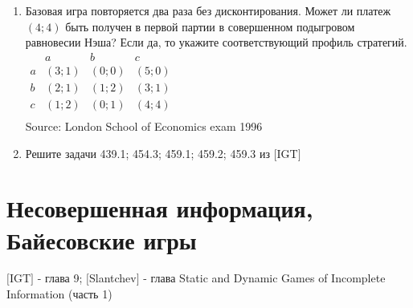 \documentclass[pdftex,12pt,a4paper]{article}
\begin{document}
\begin{enumerate}
\item 
Базовая игра повторяется два раза без дисконтирования. Может ли платеж $\left( {4;4} \right)$
 быть получен в первой партии в совершенном подыгровом равновесии Нэша? Если да, то укажите соответствующий профиль стратегий.\\
$\begin{array}{c|ccc}
    {} &  a & b & c   \\
\hline
    a &  {\left( {3;1} \right)} & {\left( {0;0} \right)} & {\left( {5;0} \right)}   \\
    b &  {\left( {2;1} \right)} & {\left( {1;2} \right)} & {\left( {3;1} \right)}   \\
    c &  {\left( {1;2} \right)} & {\left( {0;1} \right)} & {\left( {4;4} \right)}   \\
\end{array}$\\
Source: London School of Economics exam 1996 

\item Решите задачи 439.1; 454.3; 459.1; 459.2; 459.3 из $[$IGT$]$ 

\end{enumerate}

\section{Несовершенная информация, Байесовские игры}

$[$IGT$]$ - глава 9; $[$Slantchev$]$ - глава Static and Dynamic Games of Incomplete Information (часть 1) \\
\end{document}
